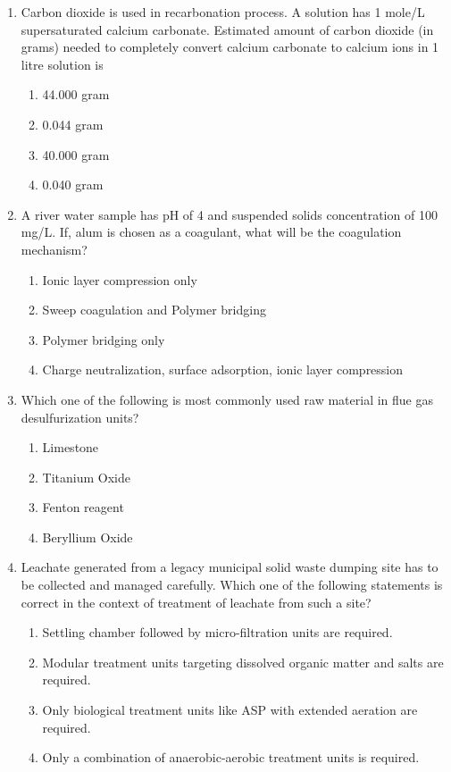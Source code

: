 \documentclass[12pt,a4paper]{article}
\begin{document}
\begin{enumerate}
   \item Carbon dioxide is used in recarbonation process. A solution has 1 mole/L supersaturated calcium carbonate. Estimated amount of carbon dioxide (in grams) needed to completely convert calcium carbonate to calcium ions in 1 litre solution is
         \begin{enumerate}
            \item 44.000 gram
            \item 0.044 gram
            \item 40.000 gram
            \item 0.040 gram
         \end{enumerate}

   \item A river water sample has pH of 4 and suspended solids concentration of 100 mg/L. If, alum is chosen as a coagulant, what will be the coagulation mechanism?
         \begin{enumerate}
            \item Ionic layer compression only
            \item Sweep coagulation and Polymer bridging
            \item Polymer bridging only
            \item Charge neutralization, surface adsorption, ionic layer compression
         \end{enumerate}

   \item Which one of the following is most commonly used raw material in flue gas desulfurization units?
         \begin{enumerate}
            \item Limestone
            \item Titanium Oxide
            \item Fenton reagent
            \item Beryllium Oxide
         \end{enumerate}

   \item Leachate generated from a legacy municipal solid waste dumping site has to be collected and managed carefully. Which one of the following statements is correct in the context of treatment of leachate from such a site?
         \begin{enumerate}
            \item Settling chamber followed by micro-filtration units are required.
            \item Modular treatment units targeting dissolved organic matter and salts are required.
            \item Only biological treatment units like ASP with extended aeration are required.
            \item Only a combination of anaerobic-aerobic treatment units is required.
         \end{enumerate}


\end{enumerate}
\end{document}
